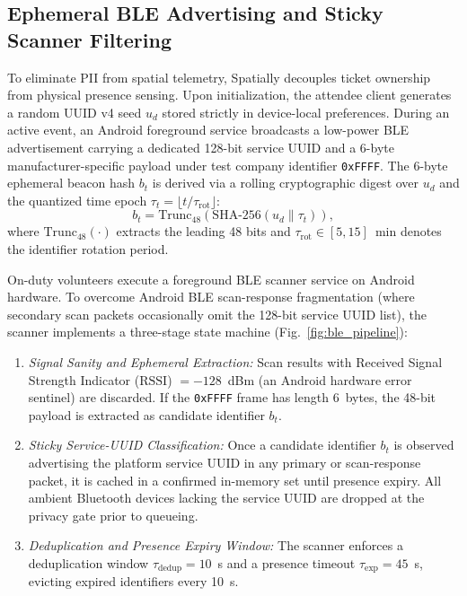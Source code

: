 \documentclass[conference,a4paper]{IEEEtran}
\begin{document}
\subsection{Ephemeral BLE Advertising and Sticky Scanner Filtering}
To eliminate PII from spatial telemetry, Spatially decouples ticket ownership from physical presence sensing. Upon initialization, the attendee client generates a random UUID v4 seed $u_d$ stored strictly in device-local preferences. During an active event, an Android foreground service broadcasts a low-power BLE advertisement carrying a dedicated 128-bit service UUID and a 6-byte manufacturer-specific payload under test company identifier \texttt{0xFFFF}. The 6-byte ephemeral beacon hash $b_t$ is derived via a rolling cryptographic digest over $u_d$ and the quantized time epoch $\tau_t = \lfloor t / \tau_{\mathrm{rot}} \rfloor$:
\begin{equation}
b_t = \mathrm{Trunc}_{48}\!\left(\mathrm{SHA\text{-}256}(u_d \parallel \tau_t)\right),
\label{eq:ble_hash}
\end{equation}
where $\mathrm{Trunc}_{48}(\cdot)$ extracts the leading 48 bits and $\tau_{\mathrm{rot}} \in [5, 15]$~min denotes the identifier rotation period.

On-duty volunteers execute a foreground BLE scanner service on Android hardware. To overcome Android BLE scan-response fragmentation (where secondary scan packets occasionally omit the 128-bit service UUID list), the scanner implements a three-stage state machine (Fig.~\ref{fig:ble_pipeline}):
\begin{enumerate}
    \item \emph{Signal Sanity and Ephemeral Extraction:} Scan results with Received Signal Strength Indicator ($\mathrm{RSSI}$) $= -128$~dBm (an Android hardware error sentinel) are discarded. If the \texttt{0xFFFF} frame has length 6~bytes, the 48-bit payload is extracted as candidate identifier $b_t$.
    \item \emph{Sticky Service-UUID Classification:} Once a candidate identifier $b_t$ is observed advertising the platform service UUID in any primary or scan-response packet, it is cached in a confirmed in-memory set until presence expiry. All ambient Bluetooth devices lacking the service UUID are dropped at the privacy gate prior to queueing.
    \item \emph{Deduplication and Presence Expiry Window:} The scanner enforces a deduplication window $\tau_{\mathrm{dedup}} = 10$~s and a presence timeout $\tau_{\mathrm{exp}} = 45$~s, evicting expired identifiers every 10~s.
\end{enumerate}
\end{document}
